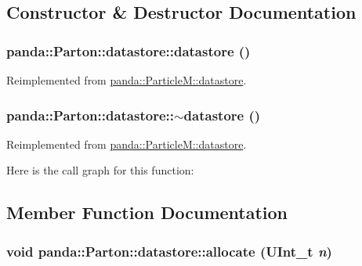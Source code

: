 \subsection{Constructor \& Destructor Documentation}
\hypertarget{structpanda_1_1Parton_1_1datastore_aa447f1603ab6cfdf50e6406d1ef00819}{
\subsubsection[{datastore}]{\setlength{\rightskip}{0pt plus 5cm}panda::Parton::datastore::datastore ()}}
\label{structpanda_1_1Parton_1_1datastore_aa447f1603ab6cfdf50e6406d1ef00819}


Reimplemented from \hyperlink{structpanda_1_1ParticleM_1_1datastore_acc9af307e2c4fee9bc5d9bbb37ad6124}{panda::ParticleM::datastore}.\hypertarget{structpanda_1_1Parton_1_1datastore_aa1e55feb33f97040c324d9ba93126dba}{
\subsubsection[{$\sim$datastore}]{\setlength{\rightskip}{0pt plus 5cm}panda::Parton::datastore::$\sim$datastore ()}}
\label{structpanda_1_1Parton_1_1datastore_aa1e55feb33f97040c324d9ba93126dba}


Reimplemented from \hyperlink{structpanda_1_1ParticleM_1_1datastore_ae068980c20730bc8565d2f7ea701bc5e}{panda::ParticleM::datastore}.

Here is the call graph for this function:

\subsection{Member Function Documentation}
\hypertarget{structpanda_1_1Parton_1_1datastore_ab13044f2228c663b73a6e24f0967a445}{
\subsubsection[{allocate}]{\setlength{\rightskip}{0pt plus 5cm}void panda::Parton::datastore::allocate (UInt\_\-t {\em n})}}
\label{structpanda_1_1Parton_1_1datastore_ab13044f2228c663b73a6e24f0967a445}


